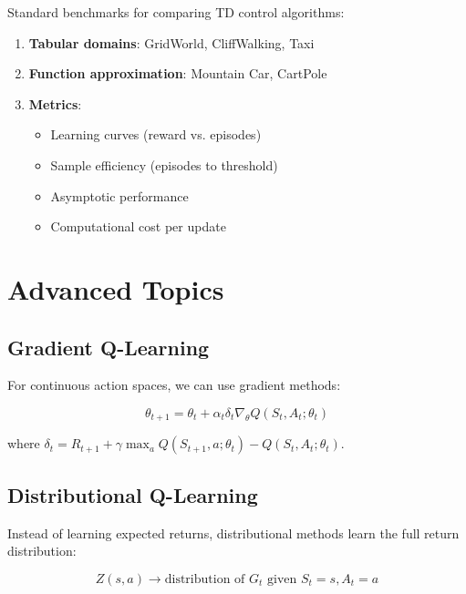 \begin{examplebox}
Standard benchmarks for comparing TD control algorithms:
\begin{enumerate}
\item \textbf{Tabular domains}: GridWorld, CliffWalking, Taxi
\item \textbf{Function approximation}: Mountain Car, CartPole
\item \textbf{Metrics}: 
   \begin{itemize}
   \item Learning curves (reward vs. episodes)
   \item Sample efficiency (episodes to threshold)
   \item Asymptotic performance
   \item Computational cost per update
   \end{itemize}
\end{enumerate}
\end{examplebox}

\section{Advanced Topics}

\subsection{Gradient Q-Learning}

For continuous action spaces, we can use gradient methods:

\begin{equation}
\theta_{t+1} = \theta_t + \alpha_t \delta_t \nabla_\theta Q(S_t, A_t; \theta_t)
\end{equation}

where $\delta_t = R_{t+1} + \gamma \max_a Q(S_{t+1}, a; \theta_t) - Q(S_t, A_t; \theta_t)$.

\subsection{Distributional Q-Learning}

Instead of learning expected returns, distributional methods learn the full return distribution:

\begin{equation}
Z(s,a) \rightarrow \text{distribution of } G_t \text{ given } S_t = s, A_t = a
\end{equation}


